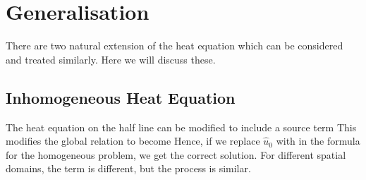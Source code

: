 \documentclass{article}
\begin{document}
\section{Generalisation}
There are two natural extension of the heat equation which can be considered and treated similarly. Here we will discuss these. 

\subsection{Inhomogeneous Heat Equation}
The heat equation on the half line can be modified to include a source term 
This modifies the global relation to become 
Hence, if we replace $\hat{u}_0$ with  
in the formula for the homogeneous problem, we get the correct solution. For different spatial domains, the term is different, but the process is similar. 
\end{document}
